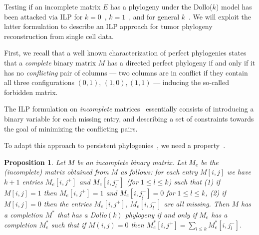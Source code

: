 \documentclass[a4paper,USenglish]{article}
\newtheorem{proposition}[theorem]{Proposition}
\theoremstyle{definition}
\begin{document}
Testing if an incomplete matrix $E$ has a phylogeny under the Dollo($k$) model has been
attacked via ILP for $k=0$~\cite{Gusfield2007}, $k=1$~\cite{gusfield_persistent_2015}, and
for general $k$~\cite{Bonizzoni:2017:BPP:3107411.3107441}.
We will exploit the latter formulation to describe an ILP approach for tumor phylogeny
reconstruction from single cell data.


First, we recall that a  well  known characterization  of perfect  phylogenies states
that a \emph{complete}
binary matrix $M$ has a directed perfect phylogeny if and only if
it has  no \emph{conflicting}  pair of columns ---  two columns  are in
conflict  if  they contain  all  three configurations  $(0,1)$,
$(1,0), (1,1)$ --- inducing the so-called forbidden matrix.

The ILP formulation on \emph{incomplete} matrices~\cite{Gusfield2007} essentially consists
of introducing a binary variable for each missing entry, and describing a set of
constraints towards the goal of minimizing the conflicting pairs. 

To adapt this approach to persistent phylogenies~\cite{gusfield_persistent_2015}, we need 
a property~\cite{Bonizzoni:2017:BPP:3107411.3107441}.

\begin{proposition}
  \label{proposition:extended matrix}
  Let $M$ be an incomplete binary matrix.
  Let $M_{e}$ be the (incomplete) matrix obtained from $M$ as follows:
  for each entry $M[i,j]$ we have $k+1$ entries $M_{e}[i,j^{+}]$ and
$M_{e}[i,j_{l}^{-}]$ (for $1\le l\le k$) such that (1) if $M[i,j] = 1$ then $M_{e}[i,j^{+}] = 1$ and
$M_{e}[i,j_{l}^{-}] = 0$ for $1\le l\le k$, (2) if $M[i,j] = 0$ then the entries
$M_{e}[i,j^{+}]$, $ M_{e}[i,j_{l}^{-}]$ are all missing.
Then $M$ has a completion $M^{*}$ that has a Dollo$(k)$ phylogeny if and only if $M_{e}$
has a completion $M^{*}_{e}$ such that if $M(i,j)= 0$ then $M^{*}_{e}[i,j^{+}] = \sum_{l\le
  k} M^{*}_{e}[i,j_{l}^{-}]$.
\end{proposition}
\end{document}
